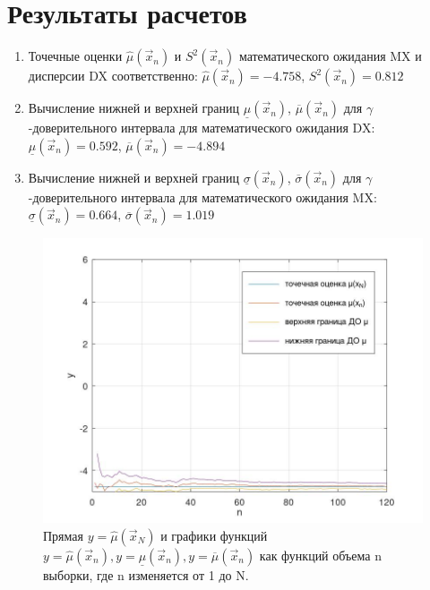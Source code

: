 \chapter{Результаты расчетов}
\begin{enumerate}
	\item Точечные оценки $\hat \mu (\vec x_n)$ и $ S^2 (\vec x_n)$ математического ожидания MX и дисперсии DX соответственно: $\hat \mu (\vec x_n) = -4.758$, $ S^2 (\vec x_n) = 0.812$
	\item Вычисление нижней и верхней границ $\underline \mu (\vec x_n)$, $\overline \mu (\vec x_n)$ для $\gamma$-доверительного интервала для математического ожидания DX: $\underline \mu (\vec x_n) = 0.592$, $\overline\mu (\vec x_n) = -4.894$
	\item Вычисление нижней и верхней границ $\underline \sigma (\vec x_n)$, $\overline \sigma (\vec x_n)$ для $\gamma$-доверительного интервала для математического ожидания MX: $\underline \sigma (\vec x_n) = 0.664$, $\overline \sigma (\vec x_n) = 1.019$
\end{enumerate}
%
\begin{figure}[H]
		\centering
		\includegraphics[scale=0.4]{assets/g-1.jpg}
		\caption{Прямая $y=\hat \mu (\vec x_N)$ и графики функций $y=\hat \mu (\vec x_n), y= \underline \mu (\vec x_n), y =\overline \mu (\vec x_n)$ как функций объема n выборки, где n изменяется от 1 до N.}
\end{figure}
%

